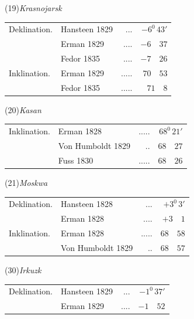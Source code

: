 \begin{center}
\begin{minipage}[t]{\linewidth}\centering
(19)\quad\textit{Krasnojarsk}\par\smallskip
\begin{tabular}{llrr}
Deklination.&Hansteen 1829&.\quad.\quad.&$-6^0\,43'$\\
&Erman 1829&.\quad.\quad.\quad.&$-6\quad37$\\
&Fedor 1835&.\quad.\quad.\quad.&$-7\quad26$\\
Inklination.&Erman 1829&.\quad.\quad.\quad.\quad.&$70\quad53$\\
&Fedor 1835&.\quad.\quad.\quad.\quad.&$71\quad8$
\end{tabular}
\end{minipage}\par\medskip
\begin{minipage}[t]{\linewidth}\centering
(20)\quad\textit{Kasan}\par\smallskip
\begin{tabular}{llrr}
Inklination.&Erman 1828&.\quad.\quad.\quad.\quad.&$68^0\,21'$\\
&Von Humboldt 1829&.\quad.&$68\quad27$\\
&Fuss 1830&.\quad.\quad.\quad.\quad.&$68\quad26$
\end{tabular}
\end{minipage}\par\medskip
\begin{minipage}[t]{\linewidth}\centering
(21)\quad\textit{Moskwa}\par\smallskip
\begin{tabular}{llrr}
Deklination.&Hansteen 1828&.\quad.\quad.&$+3^0\,3'$\\
&Erman 1828&.\quad.\quad.\quad.&$+3\quad1$\\
Inklination.&Erman 1828&.\quad.\quad.\quad.\quad.&$68\quad58$\\
&Von Humboldt 1829&.\quad.&$68\quad57$
\end{tabular}
\end{minipage}\par\medskip
\begin{minipage}[t]{\linewidth}\centering
(30)\quad\textit{Irkuzk}\par\smallskip
\begin{tabular}{llrr}
Deklination.&Hansteen 1829&.\quad.\quad.&$-1^0\,37'$\\
&Erman 1829&.\quad.\quad.\quad.&$-1\quad52$\\

\end{tabular}
\end{minipage}
\end{center}

